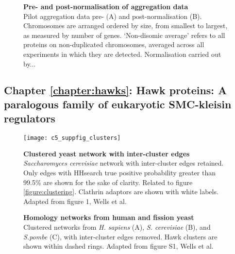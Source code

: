 \documentclass[a4paper,11pt,twoside,openright]{scrbook}
\begin{document}
\begin{figure}[h]  \caption[Pre-
        and post-normalisation of aggregation data]{\sffamily \textbf{Pre- and
        post-normalisation of aggregation data} \\ \small Pilot aggregation data
        pre- (A) and post-normalisation (B). Chromosomes are arranged ordered by
        size, from smallest to largest, as measured by number of genes.
        `Non-disomic average' refers to all proteins on non-duplicated
        chromosomes, averaged across all experiments in which they are detected.
        Normalisation carried out by...} \label{suppfigure:aneuploidy_aggnorm}
\end{figure}


\clearpage

\subsection{Chapter \ref*{chapter:hawks}: Hawk proteins: A paralogous family of
eukaryotic SMC-kleisin regulators}

\vspace{35mm}

\begin{figure}[hb] \texttt{[image: c5\_suppfig\_clusters]} \caption[Clustered
    yeast network with inter-cluster edges]{\sffamily \textbf{Clustered yeast
    network with inter-cluster edges} \\ \small  \textit{Saccharomyces
    cerevisiae} network with inter-cluster edges retained. Only edges with
    HHsearch true positive probability greater than 99.5\% are shown for the
    sake of clarity. Related to figure \ref{figure:clustering}. Clathrin
    adaptors are shown with white labels. Adapted from figure 1, Wells et al.
    \cite{Wells2017}} \label{suppfigure:yeastnetwork} \end{figure}

\begin{figure}[h]
    \caption[Homology networks from human and fission yeast]{\sffamily
    \textbf{Homology networks from human and fission yeast} \\ \small Clustered
    networks from \textit{H. sapiens} (A), \textit{S. cerevisiae} (B), and
    \textit{S.pombe} (C), with inter-cluster edges removed. Hawk clusters are
    shown within dashed rings. Adapted from figure S1, Wells et al.
    \cite{Wells2017}} \label{suppfigure:rawnetwork} \end{figure}
\end{document}
